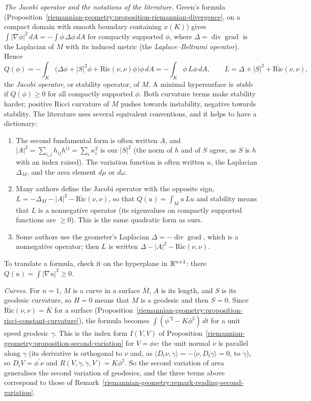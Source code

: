 \begin{remark}
\emph{The Jacobi operator and the notations of the literature.} Green's formula (Proposition~\ref{riemannian-geometry:proposition-riemannian-divergence}, on a compact domain with smooth
boundary containing $x(K)$) gives $\int|\nabla\phi|^2\,dA = -\int\phi\,\Delta\phi\,dA$ for compactly supported $\phi$, where $\Delta = \operatorname{div}\operatorname{grad}$ is the Laplacian of $M$
with its induced metric (the \emph{Laplace--Beltrami operator}). Hence
\[
Q(\phi) = -\int_K\bigl(\Delta\phi + |S|^2\phi + \overline{\mathrm{Ric}}(\nu, \nu)\phi\bigr)\phi\,dA = -\int_K\phi\,L\phi\,dA, \qquad L = \Delta + |S|^2 + \overline{\mathrm{Ric}}(\nu, \nu),
\]
the \emph{Jacobi operator}, or stability operator, of $M$. A minimal hypersurface is \emph{stable} if $Q(\phi) \geq 0$ for all compactly supported $\phi$. Both curvature terms make stability
harder; positive Ricci curvature of $\overline{M}$ pushes towards instability, negative towards stability. The literature uses several equivalent conventions, and it helps to have a
dictionary:
\begin{enumerate}
\item The second fundamental form is often written $A$, and $|A|^2 = \sum_{i,j}h_{ij}h^{ij} = \sum_i\kappa_i^2$ is our $|S|^2$ (the norm of $h$ and of $S$ agree, as $S$ is $h$ with an
index raised). The variation function is often written $u$, the Laplacian $\Delta_M$, and the area element $d\mu$ or $d\omega$.
\item Many authors define the Jacobi operator with the opposite sign, $L = -\Delta_M - |A|^2 - \overline{\mathrm{Ric}}(\nu, \nu)$, so that $Q(u) = \int_Mu\,Lu$ and stability means that $L$ is a
nonnegative operator (its eigenvalues on compactly supported functions are $\geq 0$). This is the same quadratic form as ours.
\item Some authors use the geometer's Laplacian $\Delta = -\operatorname{div}\operatorname{grad}$, which is a nonnegative operator; then $L$ is written $\Delta - |A|^2 - \overline{\mathrm{Ric}}(\nu, \nu)$.
\end{enumerate}
To translate a formula, check it on the hyperplane in $\mathbb{R}^{n+1}$: there $Q(u) = \int|\nabla u|^2 \geq 0$.

\emph{Curves.} For $n = 1$, $M$ is a curve in a surface $\overline{M}$, $A$ is its length, and $S$ is its geodesic curvature, so $H = 0$ means that $M$ is a geodesic and then $S = 0$. Since
$\overline{\mathrm{Ric}}(\nu, \nu) = \overline{K}$ for a surface (Proposition~\ref{riemannian-geometry:proposition-ricci-constant-curvature}), the formula becomes $\int(\phi^{\prime 2} - K\phi^2)\,dt$ for
a unit speed geodesic $\gamma$. This is the index form $I(V, V)$ of Proposition~\ref{riemannian-geometry:proposition-second-variation} for $V = \phi\nu$: the unit normal $\nu$ is parallel along
$\gamma$ (its derivative is orthogonal to $\nu$ and, as $\langle D_t\nu, \dot\gamma\rangle = -\langle\nu, D_t\dot\gamma\rangle = 0$, to $\dot\gamma$), so $D_tV = \phi^{\prime}\nu$ and
$R(V, \dot\gamma, \dot\gamma, V) = K\phi^2$. So the second variation of area generalises the second variation of geodesics, and the three terms above correspond to those of
Remark~\ref{riemannian-geometry:remark-reading-second-variation}.
\end{remark}

